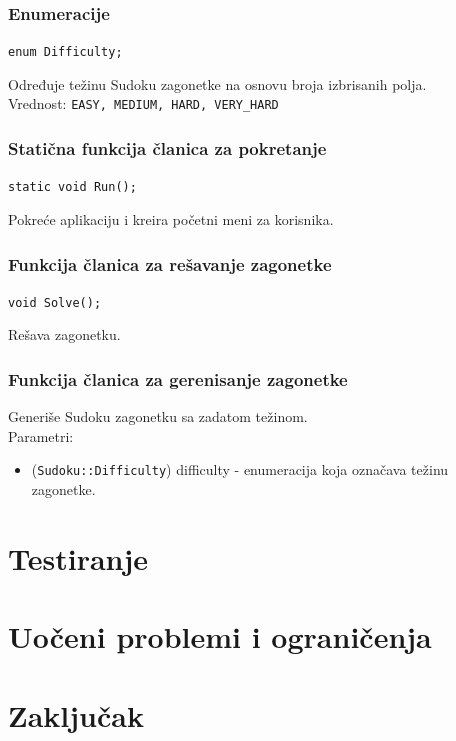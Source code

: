 \documentclass[a4paper]{article}
\begin{document}
    \subsubsection{Enumeracije}
    \texttt{enum Difficulty;}
    \par Određuje težinu Sudoku zagonetke na osnovu broja izbrisanih polja. \\ 
    Vrednost: \texttt{EASY, MEDIUM, HARD, VERY\_HARD}

    \subsubsection{Statična funkcija članica za pokretanje}
    \texttt{static void Run();}
    \par Pokreće aplikaciju i kreira početni meni za korisnika.
    \subsubsection{Funkcija članica za rešavanje zagonetke}
    \texttt{void Solve();}
    \par Rešava zagonetku.
    
    \subsubsection{Funkcija članica za gerenisanje zagonetke}
    \par Generiše Sudoku zagonetku sa zadatom težinom. \\
    Parametri:
    \begin{itemize}
        \item (\texttt{Sudoku::Difficulty}) difficulty - enumeracija koja označava težinu zagonetke.
    \end{itemize}

    \newpage
    
    \section{Testiranje}
    \newpage
    \section{Uočeni problemi i ograničenja}
    \newpage
    \section{Zaključak}
    \newpage
\end{document}
